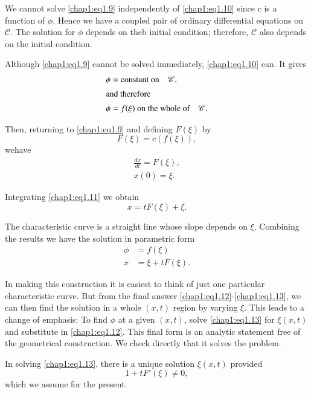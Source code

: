 We cannot solve \eqref{chap1:eq1.9} independently of \eqref{chap1:eq1.10} since $c$ is a function of $\phi$. Hence we have a coupled pair of ordinary differential equations on $\mathscr{C}$. The solution for $\phi$ depends on theb initial condition; therefore, $\mathscr{C}$ also depends on the initial condition.

Although \eqref{chap1:eq1.9} cannot be solved immediately, \eqref{chap1:eq1.10} can. It gives 
\begin{align*}
\phi &= \text{constant on}\quad\mathscr{C},\\
\intertext{and therefore}
\phi &= f(\xi)\text{ on the whole of}\quad\mathscr{C}.
\end{align*}

Then, returning to \eqref{chap1:eq1.9} and defining $F(\xi)$ by 
$$
F(\xi)=c(f(\xi)),
$$
we\pageoriginale have 
\setcounter{equation}{10}
\begin{equation}
\begin{split}\label{chap1:eq1.11}
\frac{dx}{dt}=F(\xi),\\
x(0)=\xi.
\end{split}
\end{equation}

Integrating \eqref{chap1:eq1.11} we obtain
$$
x=tF(\xi)+\xi.
$$

The characteristic curve is a straight line whose slope depends on
$\xi$. Combining the results we have the solution in parametric form 
\begin{align}
\phi &= f(\xi)\tag{1.12}\label{chap1:eq1.12}\\
x&= \xi +tF(\xi).\tag{1.13}\label{chap1:eq1.13}
\end{align}

In making this construction it is easiest to think of just one particular characteristic curve. But from the final answer \eqref{chap1:eq1.12}-\eqref{chap1:eq1.13}, we can then find the solution in a whole $(x,t)$ region by varying $\xi$. This leads to a change of emphasis: To find $\phi$ at a given $(x,t)$, solve \eqref{chap1:eq1.13} for $\xi(x,t)$ and substitute in \eqref{chap1:eq1.12}. This final form is an analytic statement free of the geometrical construction. We check directly that it solves the problem.

In solving \eqref{chap1:eq1.13}, there is a unique solution $\xi(x,t)$ provided
\begin{equation}
1+tF'(\xi)\neq 0,\tag{1.14}\label{chap1:eq1.14}
\end{equation}
which we assume for the present.

